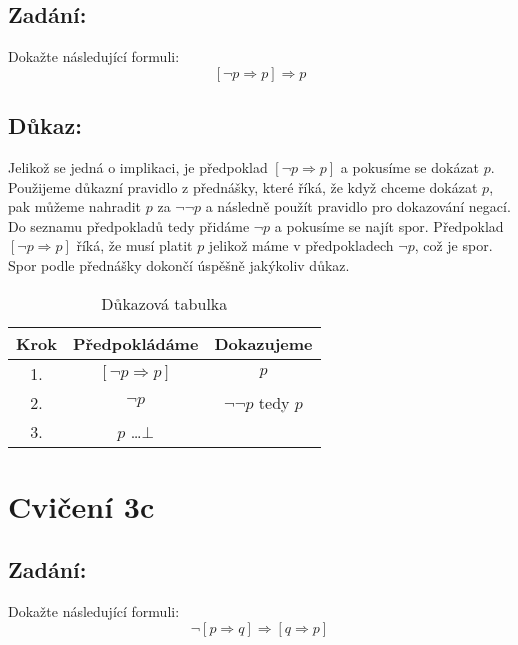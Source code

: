 \documentclass{article}
\begin{document}
\subsection{Zadání:}
Dokažte následující formuli:
$$[\neg p \Rightarrow p] \Rightarrow p$$

\subsection{Důkaz:}
Jelikož se jedná o implikaci, je předpoklad $[\neg p \Rightarrow p]$ a pokusíme se dokázat $p$. Použijeme důkazní pravidlo z přednášky, které říká, že když chceme dokázat $p$, pak můžeme nahradit $p$ za $\neg \neg p$ a následně použít pravidlo pro dokazování negací. Do seznamu předpokladů tedy přidáme $\neg p$ a pokusíme se najít spor. Předpoklad $[\neg p \Rightarrow p]$ říká, že musí platit $p$ jelikož máme v předpokladech $\neg p$, což je spor. Spor podle přednášky dokončí úspěšně jakýkoliv důkaz.

\begin{table}[H]\centering

    \caption{Důkazová tabulka}

\begin{tabular}{|c|c|c|}
    
    
        \hline \textbf{Krok} & \textbf{Předpokládáme} & \textbf{Dokazujeme} \\ \hline \hline
    	1. & $[\neg p \Rightarrow p]$ & $p$ \\ \hline
    	2. & $\neg p$ & $\neg \neg p$ tedy $p$ \\ \hline
    	3. & $p$ \dots $\bot$ & \\ \hline
    
            
    	\end{tabular}
\end{table}

\section{Cvičení 3c}

\subsection{Zadání:}

Dokažte následující formuli:
$$\neg [p \Rightarrow q] \Rightarrow [q \Rightarrow p]$$
\end{document}
